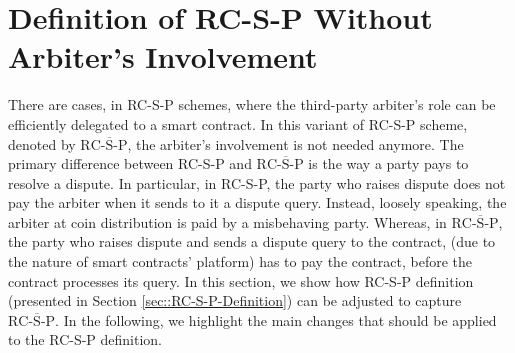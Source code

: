 
\section{Definition of RC-S-P Without Arbiter's Involvement}\label{sec::RC-S-P-Definition2}
There are cases, in RC-S-P schemes, where the third-party arbiter's role  can be  efficiently delegated to a smart contract.  In this variant of RC-S-P scheme, denoted by ${\text{RC-}\overline{\text{S}}\text{-P}}$, the arbiter's involvement is not needed anymore. The primary difference between RC-S-P and ${\text{RC-}\overline{\text{S}}\text{-P}}$ is the way a party pays to resolve a dispute. In particular, in RC-S-P, the party who raises dispute does not pay the arbiter when it sends to it a dispute query. Instead, loosely speaking, the arbiter at coin distribution is paid by a misbehaving party. Whereas, in ${\text{RC-}\overline{\text{S}}\text{-P}}$, the party who raises dispute and sends a dispute query to the contract, (due to the nature of smart contracts' platform) has to pay the contract, before the contract processes its query.  In this section, we show how RC-S-P definition (presented in Section \ref{sec::RC-S-P-Definition}) can be  adjusted to  capture ${\text{RC-}\overline{\text{S}}\text{-P}}$. In the following, we highlight the main changes that should be applied to the RC-S-P definition. 

